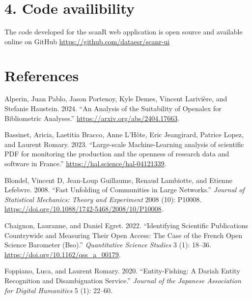 \documentclass[
]{article}
\newlength{\cslhangindent}
\newenvironment{cslreferences}%
  {\setlength{\parindent}{0pt}%
  \everypar{\setlength{\hangindent}{\cslhangindent}}\ignorespaces}%
  {\par}
\begin{document}
\hypertarget{code-availibility}{%
\section{4. Code availibility}\label{code-availibility}}

The code developed for the scanR web application is open source and
available online on GitHub \url{https://github.com/dataesr/scanr-ui}

\hypertarget{references}{%
\section*{References}\label{references}}

\hypertarget{refs}{}
\begin{cslreferences}
\leavevmode\hypertarget{ref-alperin2024analysissuitabilityopenalexbibliometric}{}%
Alperin, Juan Pablo, Jason Portenoy, Kyle Demes, Vincent Larivière, and
Stefanie Haustein. 2024. ``An Analysis of the Suitability of Openalex
for Bibliometric Analyses.'' \url{https://arxiv.org/abs/2404.17663}.

\leavevmode\hypertarget{ref-bassinet:hal-04121339}{}%
Bassinet, Aricia, Laetitia Bracco, Anne L'Hôte, Eric Jeangirard, Patrice
Lopez, and Laurent Romary. 2023. ``Large-scale Machine-Learning analysis
of scientific PDF for monitoring the production and the openness of
research data and software in France.''
\url{https://hal.science/hal-04121339}.

\leavevmode\hypertarget{ref-Blondel_2008}{}%
Blondel, Vincent D, Jean-Loup Guillaume, Renaud Lambiotte, and Etienne
Lefebvre. 2008. ``Fast Unfolding of Communities in Large Networks.''
\emph{Journal of Statistical Mechanics: Theory and Experiment} 2008
(10): P10008. \url{https://doi.org/10.1088/1742-5468/2008/10/P10008}.

\leavevmode\hypertarget{ref-10.1162ux2fqss_a_00179}{}%
Chaignon, Lauranne, and Daniel Egret. 2022. ``Identifying Scientific
Publications Countrywide and Measuring Their Open Access: The Case of
the French Open Science Barometer (Bso).'' \emph{Quantitative Science
Studies} 3 (1): 18--36. \url{https://doi.org/10.1162/qss_a_00179}.

\leavevmode\hypertarget{ref-foppiano2020entity}{}%
Foppiano, Luca, and Laurent Romary. 2020. ``Entity-Fishing: A Dariah
Entity Recognition and Disambiguation Service.'' \emph{Journal of the
Japanese Association for Digital Humanities} 5 (1): 22--60.


\end{cslreferences}
\end{document}
